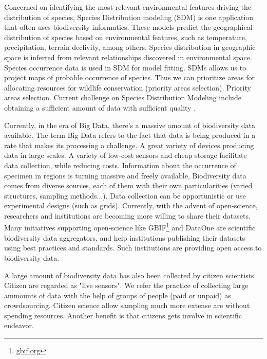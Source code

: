 Concerned on identifying the most relevant environmental features driving the distribution of species, Species Distribution modeling (SDM) is one application that often uses biodiversity informatics.
These models predict the geographical distribution of species based on environmental features, such as temperature, precipitation, terrain declivity, among others.
Species distribution in geographic space is inferred from relevant relationships discovered in environmental space.
Species occurrence data is used in SDM for model fitting. 
SDMs allows us to project maps of probable occurrence of species.
Thus we can prioritize areas for allocating resources for wildlife conservation (priority areas selection).
Priority areas selection. %
Current challenge on Species Distribution Modeling include obtaining a sufficient amount of data with sufficient quality \cite{Araujo2006}.


Currently, in the era of Big Data, there's a massive amount of biodiversity data available. 
The term Big Data refers to the fact that data is being produced in a rate that makes its processing a challenge.
A great variety of devices producing data in large scales.
A variety of low-cost sensors and cheap storage facilitate data collection, while reducing costs.
Information about the occurrence of specimen in regions is turning massive and freely available,
Biodiversity data comes from diverse sources, each of them with their own particularities (varied structures, sampling methods...).
Data collection can be opportunistic or use experimental designs (such as grids).
Currently, with the advent of open-science, researchers and institutions are becoming more willing to share their datasets. 
Many initiatives supporting open-science like GBIF\footnote{\url{gbif.org}} \cite{gbif} and DataOne are scientific biodiversity data aggregators, and help institutions publishing their datasets using best practices and standards. %
Such institutions are providing open access to biodiversity data.


A large amount of biodiversity data has also been collected by citizen scientists. 
Citizen are regarded as "live sensors".
We refer the practice of collecting large ammounts of data with the help of groups of people (paid or unpaid) as crowdsourcing.
Citizen science allow sampling much more extense are without spending resources.
Another benefit is that citizens gets involve in scientific endeavor.


